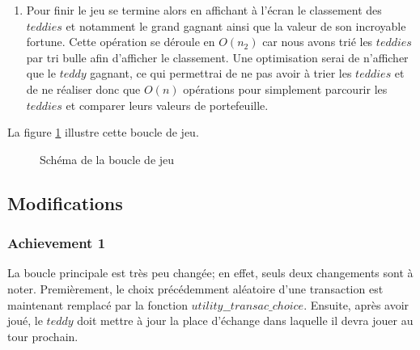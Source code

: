 \documentclass{article}
\begin{document}
\begin{enumerate}
    \item Pour finir le jeu se termine alors en affichant à l'écran le classement des $teddies$ et notamment le grand gagnant ainsi que la valeur de son incroyable fortune. Cette opération se déroule en $O(n_2)$ car nous avons trié les $teddies$ par tri bulle afin d'afficher le classement. Une optimisation serai de n'afficher que le $teddy$ gagnant, ce qui permettrai de ne pas avoir à trier les $teddies$ et de ne réaliser donc que $O(n)$ opérations pour simplement parcourir les $teddies$ et comparer leurs valeurs de portefeuille.
\end{enumerate} 
La figure \ref{fig:gameloop} illustre cette boucle de jeu.

\begin{figure}[h]
    \centering
    \caption{Schéma de la boucle de jeu}
    \label{fig:gameloop}
\end{figure}

\newpage
 
\subsection{Modifications}
\subsubsection{Achievement 1}
La boucle principale est très peu changée; en effet, seuls deux changements sont à noter. Premièrement, le choix précédemment aléatoire d'une transaction est maintenant remplacé par la fonction $utility\_\_transac\_choice$. Ensuite, après avoir joué, le $teddy$ doit mettre à jour la place d'échange dans laquelle il devra jouer au tour prochain. 
\end{document}
